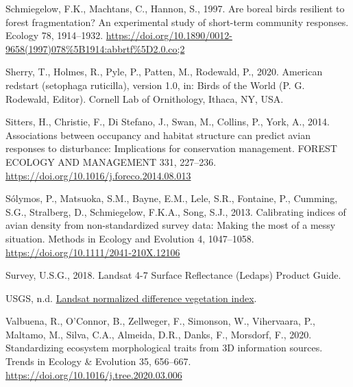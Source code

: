 \documentclass[
]{article}
\newlength{\cslhangindent}
\newlength{\cslentryspacingunit} %
\newenvironment{CSLReferences}[2] %
 {%
  \setlength{\parindent}{0pt}
  \ifodd #1
  \let\oldpar\par
  \def\par{\hangindent=\cslhangindent\oldpar}
  \fi
  \setlength{\parskip}{#2\cslentryspacingunit}
 }%
 {}
\begin{document}
\begin{CSLReferences}{1}{0}
\leavevmode{}%
Schmiegelow, F.K., Machtans, C., Hannon, S., 1997. Are boreal birds resilient to forest fragmentation? {An} experimental study of short-term community responses. Ecology 78, 1914--1932. \url{https://doi.org/10.1890/0012-9658(1997)078\%5B1914:abbrtf\%5D2.0.co;2}

\leavevmode{}%
Sherry, T., Holmes, R., Pyle, P., Patten, M., Rodewald, P., 2020. American redstart (setophaga ruticilla), version 1.0, in: Birds of the {World} ({P}. {G}. {Rodewald}, {Editor}). Cornell Lab of Ornithology, Ithaca, NY, USA.

\leavevmode{}%
Sitters, H., Christie, F., Di Stefano, J., Swan, M., Collins, P., York, A., 2014. Associations between occupancy and habitat structure can predict avian responses to disturbance: {Implications} for conservation management. FOREST ECOLOGY AND MANAGEMENT 331, 227--236. \url{https://doi.org/10.1016/j.foreco.2014.08.013}

\leavevmode{}%
Sólymos, P., Matsuoka, S.M., Bayne, E.M., Lele, S.R., Fontaine, P., Cumming, S.G., Stralberg, D., Schmiegelow, F.K.A., Song, S.J., 2013. Calibrating indices of avian density from non-standardized survey data: {Making} the most of a messy situation. Methods in Ecology and Evolution 4, 1047--1058. \url{https://doi.org/10.1111/2041-210X.12106}

\leavevmode{}%
Survey, U.S.G., 2018. Landsat 4-7 {Surface} {Reflectance} ({Ledaps}) {Product} {Guide}.

\leavevmode{}%
USGS, n.d. \href{https://www.usgs.gov/land-resources/nli/landsat/landsat-normalized-difference-vegetation-index?qt-science_support_page_related_con=0\#qt-science_support_page_related_con}{Landsat normalized difference vegetation index}.

\leavevmode{}%
Valbuena, R., O'Connor, B., Zellweger, F., Simonson, W., Vihervaara, P., Maltamo, M., Silva, C.A., Almeida, D.R., Danks, F., Morsdorf, F., 2020. Standardizing ecosystem morphological traits from {3D} information sources. Trends in Ecology \& Evolution 35, 656--667. \url{https://doi.org/10.1016/j.tree.2020.03.006}


\end{CSLReferences}
\end{document}
